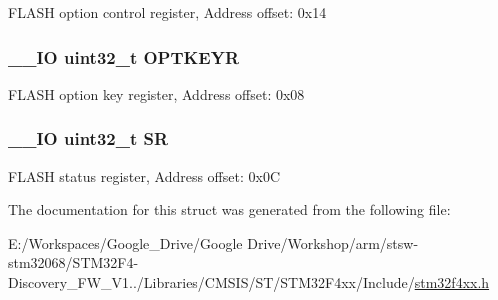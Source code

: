 F\-L\-A\-S\-H option control register, Address offset\-: 0x14 \hypertarget{struct_f_l_a_s_h___type_def_afc4900646681dfe1ca43133d376c4423}{
\subsubsection[{O\-P\-T\-K\-E\-Y\-R}]{\setlength{\rightskip}{0pt plus 5cm}\-\_\-\-\_\-\-I\-O uint32\-\_\-t O\-P\-T\-K\-E\-Y\-R}}\label{struct_f_l_a_s_h___type_def_afc4900646681dfe1ca43133d376c4423}
F\-L\-A\-S\-H option key register, Address offset\-: 0x08 \hypertarget{struct_f_l_a_s_h___type_def_af6aca2bbd40c0fb6df7c3aebe224a360}{
\subsubsection[{S\-R}]{\setlength{\rightskip}{0pt plus 5cm}\-\_\-\-\_\-\-I\-O uint32\-\_\-t S\-R}}\label{struct_f_l_a_s_h___type_def_af6aca2bbd40c0fb6df7c3aebe224a360}
F\-L\-A\-S\-H status register, Address offset\-: 0x0\-C 

The documentation for this struct was generated from the following file\-:\begin{DoxyCompactItemize}
\item 
E\-:/\-Workspaces/\-Google\-\_\-\-Drive/\-Google Drive/\-Workshop/arm/stsw-\/stm32068/\-S\-T\-M32\-F4-\/\-Discovery\-\_\-\-F\-W\-\_\-\-V1../\-Libraries/\-C\-M\-S\-I\-S/\-S\-T/\-S\-T\-M32\-F4xx/\-Include/\hyperlink{stm32f4xx_8h}{stm32f4xx.\-h}\end{DoxyCompactItemize}
